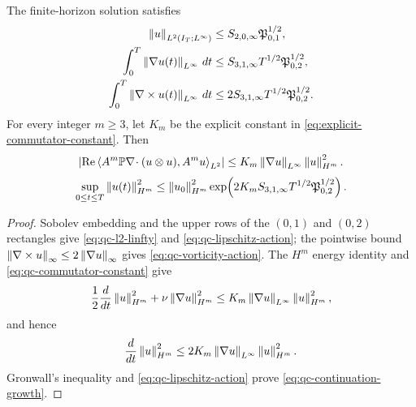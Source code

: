\begin{proposition}
\label{prop:qc-continuation-norms}
The finite-horizon solution satisfies
\begin{align}
 \left\lVert u\right\rVert_{L^2(I_T;L^\infty)}
 &\le S_{2,0,\infty}\mathfrak P_{0,1}^{1/2},
 \label{eq:qc-l2-linfty}\\
 \int_0^T\left\lVert \nabla u(t)\right\rVert_{L^\infty}\,dt
 &\le S_{3,1,\infty}T^{1/2}\mathfrak P_{0,2}^{1/2},
 \label{eq:qc-lipschitz-action}\\
 \int_0^T\left\lVert \nabla\times u(t)\right\rVert_{L^\infty}\,dt
 &\le 2S_{3,1,\infty}T^{1/2}\mathfrak P_{0,2}^{1/2}.
 \label{eq:qc-vorticity-action}
\end{align}
For every integer \(m\ge3\), let \(K_m\) be the explicit constant in
\eqref{eq:explicit-commutator-constant}.  Then
\begin{equation}
 \left|\operatorname{Re}
 \left\langle A^m\mathbb P\nabla\!\cdot(u\otimes u),A^m u\right\rangle_{L^2}\right|
 \le K_m\left\lVert \nabla u\right\rVert_{L^\infty}\left\lVert u\right\rVert_{H^m}^2.
 \label{eq:qc-commutator-constant}
\end{equation}
\begin{equation}
 \sup_{0\le t\le T}\left\lVert u(t)\right\rVert_{H^m}^2
 \le
 \left\lVert u_0\right\rVert_{H^m}^2
 \exp\!\left(
 2K_mS_{3,1,\infty}T^{1/2}\mathfrak P_{0,2}^{1/2}
 \right).
 \label{eq:qc-continuation-growth}
\end{equation}
\end{proposition}

\begin{proof}
Sobolev embedding and the upper rows of the \((0,1)\) and \((0,2)\)
rectangles give \eqref{eq:qc-l2-linfty} and
\eqref{eq:qc-lipschitz-action}; the pointwise bound
\(\left\lVert \nabla\times u\right\rVert_\infty\le2\left\lVert \nabla u\right\rVert_\infty\) gives
\eqref{eq:qc-vorticity-action}.  The \(H^m\) energy identity and
\eqref{eq:qc-commutator-constant} give
\[
 \frac12\frac d{dt}\left\lVert u\right\rVert_{H^m}^2
 +\nu\left\lVert \nabla u\right\rVert_{H^m}^2
 \le K_m\left\lVert \nabla u\right\rVert_{L^\infty}\left\lVert u\right\rVert_{H^m}^2,
\]
and hence
\[
 \frac d{dt}\left\lVert u\right\rVert_{H^m}^2
 \le2K_m\left\lVert \nabla u\right\rVert_{L^\infty}\left\lVert u\right\rVert_{H^m}^2.
\]
Gronwall's inequality and \eqref{eq:qc-lipschitz-action} prove
\eqref{eq:qc-continuation-growth}.
\end{proof}

